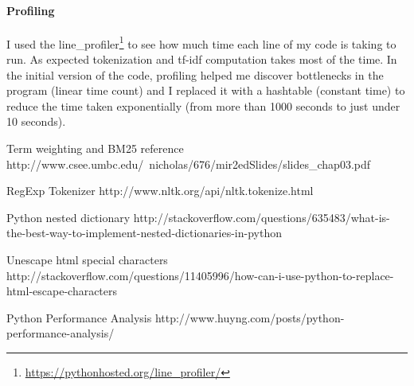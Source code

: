 \documentclass[paper=a4, fontsize=11pt]{scrartcl}
\numberwithin{equation}{section}		%
\numberwithin{figure}{section}			%
\numberwithin{table}{section}				%
\begin{document}
\paragraph{Profiling}

I used the line\_profiler\footnote{\url{https://pythonhosted.org/line_profiler/}} to see how much time each line of my code is taking to run. As expected tokenization and tf-idf computation takes most of the time. In the initial version of the code, profiling helped me discover bottlenecks in the program (linear time count) and I replaced it with a hashtable (constant time) to reduce the time taken exponentially (from more than 1000 seconds to just under 10 seconds).

\begin{thebibliography}{1}

 Term weighting and BM25 reference http://www.csee.umbc.edu/~nicholas/676/mir2edSlides/slides\_chap03.pdf

 RegExp Tokenizer http://www.nltk.org/api/nltk.tokenize.html

 Python nested dictionary http://stackoverflow.com/questions/635483/what-is-the-best-way-to-implement-nested-dictionaries-in-python
  
   Unescape html special characters http://stackoverflow.com/questions/11405996/how-can-i-use-python-to-replace-html-escape-characters

   Python Performance Analysis http://www.huyng.com/posts/python-performance-analysis/

  \end{thebibliography}

\end{document}
